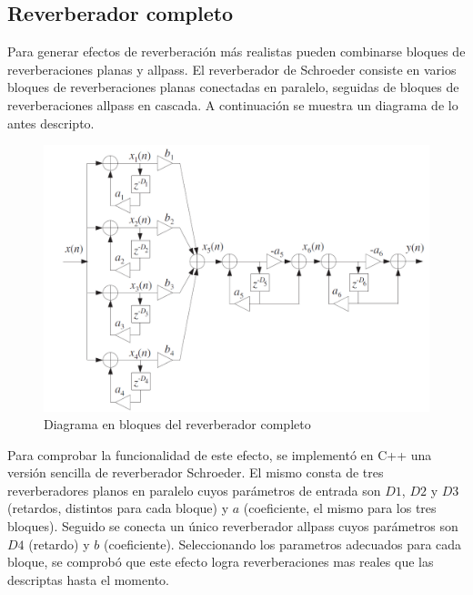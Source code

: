 \documentclass{report}
\begin{document}
\subsection*{Reverberador completo}
Para generar efectos de reverberaci\'{o}n m\'{a}s realistas pueden combinarse bloques de reverberaciones planas y allpass. El reverberador de Schroeder consiste en varios bloques de reverberaciones planas conectadas en paralelo, seguidas de bloques de reverberaciones allpass en cascada.
A continuaci\'{o}n se muestra un diagrama de lo antes descripto.

\begin{figure}[h]
  \centering
    \includegraphics[scale=0.75]{imagenes/diag_sh.png}
  \caption{ Diagrama en bloques del reverberador completo}
  \label{fig:SI}
\end{figure}


  Para comprobar la funcionalidad de este efecto, se implement\'{o} en C++ una versi\'{o}n sencilla de reverberador Schroeder. El mismo consta de tres reverberadores planos en paralelo cuyos par\'{a}metros de entrada son $D1$, $D2$ y $D3$ (retardos, distintos para cada bloque) y  $a$ (coeficiente, el mismo para los tres bloques). Seguido se conecta un \'{u}nico reverberador allpass cuyos par\'{a}metros son $D4$ (retardo) y $b$ (coeficiente). 
  Seleccionando los parametros adecuados para cada bloque, se comprob\'{o} que este efecto logra reverberaciones mas reales que las descriptas hasta el momento. 
\end{document}
